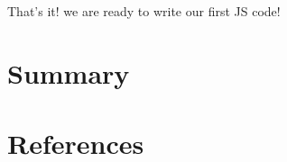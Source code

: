 \documentclass[
  letterpaper,
  DIV=11,
  numbers=noendperiod]{scrreprt}
\newlength{\cslhangindent}
\newlength{\cslentryspacingunit} %
\newenvironment{CSLReferences}[2] %
 {%
  \setlength{\parindent}{0pt}
  \ifodd #1
  \let\oldpar\par
  \def\par{\hangindent=\cslhangindent\oldpar}
  \fi
  \setlength{\parskip}{#2\cslentryspacingunit}
 }%
 {}
\begin{document}
That's it! we are ready to write our first JS code!


\hypertarget{summary}{%
\chapter{Summary}\label{summary}}


\hypertarget{references}{%
\chapter*{References}\label{references}}


\hypertarget{refs}{}
\begin{CSLReferences}{0}{0}
\end{CSLReferences}
\end{document}
